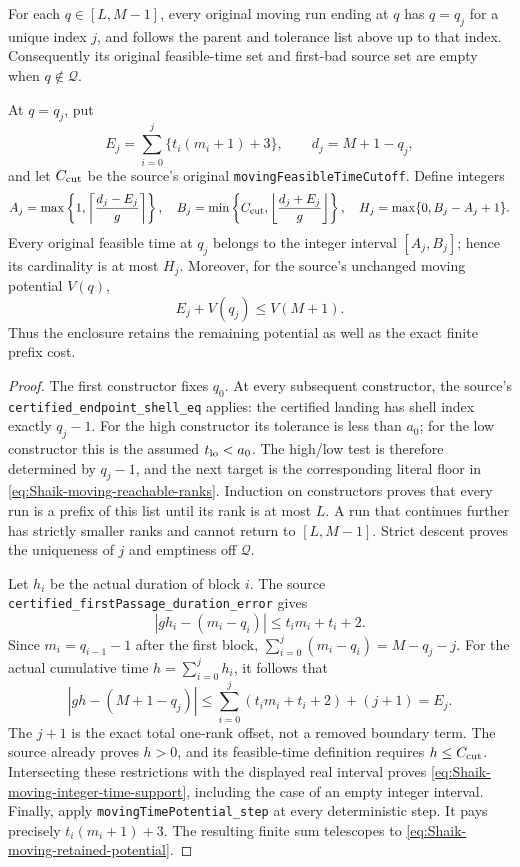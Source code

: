 \begin{proposition}
\label{prop:Shaik-moving-reachable-support}
For each \(q\in[L,M-1]\), every original moving run ending at \(q\)
has \(q=q_j\) for a unique index \(j\), and follows the parent
and tolerance list above up to that index.
Consequently its original feasible-time set and first-bad source
set are empty when \(q\notin\mathcal Q\).

At \(q=q_j\), put
\[
 E_j=\sum_{i=0}^j\{t_i(m_i+1)+3\},\qquad d_j=M+1-q_j,
\]
and let \(C_{\rm cut}\) be the source's original
\texttt{movingFeasibleTimeCutoff}. Define integers
\begin{equation}\label{eq:Shaik-moving-integer-time-support}
 A_j=\max\left\{1,\left\lceil\frac{d_j-E_j}{g}\right\rceil\right\},
 \quad
 B_j=\min\left\{C_{\rm cut},
           \left\lfloor\frac{d_j+E_j}{g}\right\rfloor\right\},
 \quad H_j=\max\{0,B_j-A_j+1\}.
\end{equation}
Every original feasible time at \(q_j\) belongs to the integer
interval \([A_j,B_j]\); hence its cardinality is at most \(H_j\).
Moreover, for the source's unchanged moving potential \(V(q)\),
\begin{equation}\label{eq:Shaik-moving-retained-potential}
 E_j+V(q_j)\le V(M+1).
\end{equation}
Thus the enclosure retains the remaining potential as well as
the exact finite prefix cost.
\end{proposition}
\begin{proof}
The first constructor fixes \(q_0\). At every subsequent constructor,
the source's \texttt{certified\_endpoint\_shell\_eq} applies:
the certified landing has shell index exactly \(q_j-1\).
For the high constructor its tolerance is less than \(a_0\);
for the low constructor this is the assumed \(t_{\rm lo}<a_0\).
The high/low test is therefore determined by \(q_j-1\), and the
next target is the corresponding literal floor in
\eqref{eq:Shaik-moving-reachable-ranks}. Induction on constructors
proves that every run is a prefix of this list until its rank is
at most \(L\). A run that continues further has strictly smaller
ranks and cannot return to \([L,M-1]\). Strict descent proves the
uniqueness of \(j\) and emptiness off \(\mathcal Q\).

Let \(h_i\) be the actual duration of block \(i\).
The source \texttt{certified\_firstPassage\_duration\_error} gives
\[
 |g h_i-(m_i-q_i)|\le t_i m_i+t_i+2.
\]
Since \(m_i=q_{i-1}-1\) after the first block,
\(\sum_{i=0}^j(m_i-q_i)=M-q_j-j\).
For the actual cumulative time \(h=\sum_{i=0}^j h_i\), it follows that
\[
 |g h-(M+1-q_j)|
 \le \sum_{i=0}^j(t_i m_i+t_i+2)+(j+1)=E_j.
\]
The \(j+1\) is the exact total one-rank offset, not a removed
boundary term. The source already proves \(h>0\), and its
feasible-time definition requires \(h\le C_{\rm cut}\).
Intersecting these restrictions with the displayed real interval
proves \eqref{eq:Shaik-moving-integer-time-support}, including
the case of an empty integer interval.
Finally, apply \texttt{movingTimePotential\_step} at every
deterministic step. It pays precisely \(t_i(m_i+1)+3\).
The resulting finite sum telescopes to
\eqref{eq:Shaik-moving-retained-potential}.
\end{proof}

